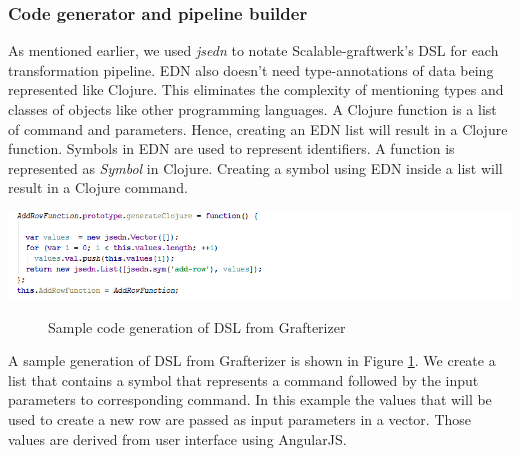 \subsubsection{Code generator and pipeline builder}
As mentioned earlier, we used \textit{jsedn} to notate Scalable-graftwerk's DSL for each transformation pipeline. EDN also doesn't need type-annotations of data being represented like Clojure. This eliminates the complexity of mentioning types and classes of objects like other programming languages. A Clojure function is a list of command and parameters. Hence, creating an EDN list will result in a Clojure function. Symbols in EDN are used to represent identifiers. A function is represented as \textit{Symbol} in Clojure. Creating a symbol using EDN inside a list will result in a Clojure command. 
\begin{center}
\includegraphics[width=36em]{./Figures/generate-clojure}
\begin{figure}[htbp]
\caption{Sample code generation of DSL from Grafterizer}
\label{fig:sample-jsedn}
\end{figure}
\end{center}
A sample generation of DSL from Grafterizer is shown in Figure \ref{fig:sample-jsedn}. We create a list that contains a symbol that represents a command followed by the input parameters to corresponding command. In this example the values that will be used to create a new row are passed as input parameters in a vector. Those values are derived from user interface using AngularJS. 




